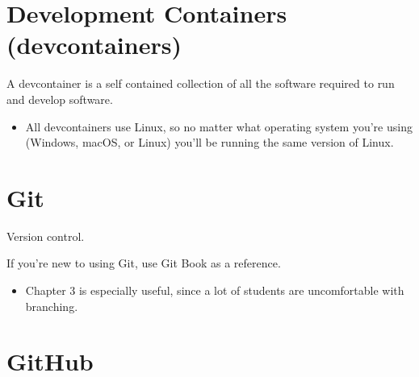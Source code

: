 \section{Development Containers (devcontainers)}
\begin{definition}
    A devcontainer is a self contained collection of all the software required to run and develop software. 
    \begin{itemize}
        \item All devcontainers use Linux, so no matter what operating system you're using (Windows, macOS, or Linux) you'll be running the same version of Linux.
    \end{itemize}
\end{definition}

\section{Git}
\begin{definition}
    Version control. 
\end{definition}

\begin{warning} If you're new to using Git, use Git Book as a reference.
    \begin{itemize}
        \item Chapter 3 is especially useful, since a lot of students are uncomfortable with branching.
    \end{itemize}
\end{warning}

\section{GitHub}
\begin{definition}
    
\end{definition}